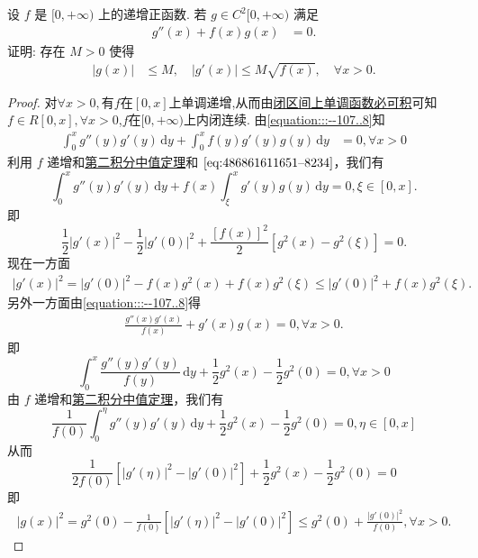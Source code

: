 \documentclass[../../main.tex]{subfiles}
\begin{document}
\begin{example}
设 \( f \) 是 \( [0,+\infty) \) 上的递增正函数. 若 \( g \in C^2[0,+\infty) \) 满足
\begin{align}
g''(x) + f(x)g(x) &= 0.\label{equation:::--107..8}
\end{align}
证明: 存在 \( M > 0 \) 使得
\begin{align}
|g(x)| &\leqslant M, \quad |g'(x)| \leqslant M\sqrt{f(x)}, \quad \forall x > 0.\label{equation:::--107..9}
\end{align}
\end{example}
\begin{proof}
对$\forall x>0,$有$f$在$[0,x]$上单调递增,从而由\hyperref[theorem:闭区间上单调函数必可积]{闭区间上单调函数必可积}可知$f\in R[0,x],\forall x>0$,$f$在$[0,+\infty)$上内闭连续.
由\eqref{equation:::--107..8}知
\begin{align}
\int_0^x g''(y)g'(y)\,\mathrm{d}y + \int_0^x f(y)g'(y)g(y)\,\mathrm{d}y &= 0, \forall x > 0 \label{eq:486861611651--8234}
\end{align}
利用 \( f \) 递增和\hyperref[theorem:积分中值定理(2)]{第二积分中值定理}和 \(\eqref{eq:486861611651--8234}\)，我们有
\[
\int_0^x g''(y)g'(y)\,\mathrm{d}y + f(x)\int_\xi^x g'(y)g(y)\,\mathrm{d}y = 0, \xi \in [0, x].
\]
即
\[
\frac{1}{2}\lvert g'(x)\rvert^2 - \frac{1}{2}\lvert g'(0)\rvert^2 + \frac{[f(x)]^2}{2}\left[g^2(x) - g^2(\xi)\right] = 0.
\]
现在一方面
\begin{align}
\lvert g'(x)\rvert^2 = \lvert g'(0)\rvert^2 - f(x)g^2(x) + f(x)g^2(\xi) \leqslant \lvert g'(0)\rvert^2 + f(x)g^2(\xi).\label{eq:::--123124523-1214} 
\end{align}
另外一方面由\eqref{equation:::--107..8}得
\begin{align*}
\frac{g''(x)g'(x)}{f(x)} + g'(x)g(x) = 0, \forall x > 0. 
\end{align*}
即
\[
\int_0^x \frac{g''(y)g'(y)}{f(y)}\,\mathrm{d}y + \frac{1}{2}g^2(x) - \frac{1}{2}g^2(0) = 0, \forall x > 0
\]
由 \( f \) 递增和\hyperref[theorem:积分中值定理(1)]{第二积分中值定理}，我们有
\[
\frac{1}{f(0)}\int_0^\eta g''(y)g'(y)\,\mathrm{d}y + \frac{1}{2}g^2(x) - \frac{1}{2}g^2(0) = 0, \eta \in [0, x]
\]
从而
\[
\frac{1}{2f(0)}\left[\lvert g'(\eta)\rvert^2 - \lvert g'(0)\rvert^2\right] + \frac{1}{2}g^2(x) - \frac{1}{2}g^2(0) = 0
\]
即
\begin{align}
\lvert g(x)\rvert^2 = g^2(0) - \frac{1}{f(0)}\left[\lvert g'(\eta)\rvert^2 - \lvert g'(0)\rvert^2\right] \leqslant g^2(0) + \frac{\lvert g'(0)\rvert^2}{f(0)},\forall x>0.\label{eq:::--123124523-1211}
\end{align}

\end{proof}
\end{document}
